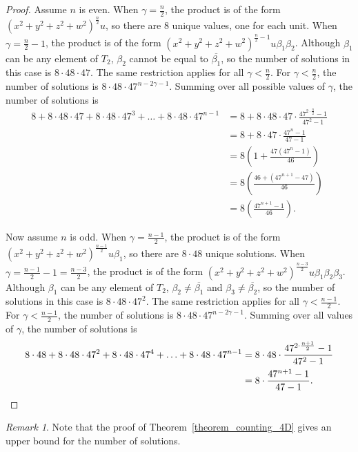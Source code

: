 \documentclass[12pt,table]{article}
\theoremstyle{definition}
\theoremstyle{remark}
\newtheorem{remark}[theorem]{Remark}
\numberwithin{equation}{section}
\begin{document}
\begin{proof}
Assume $ n $ is even.
When $ \gamma = \frac{n}{2} $, the product is of the form
$ (x^2 + y^2 + z^2 + w^2)^{\frac{n}{2}} u  $, so there are 8 unique values, one for
each unit.
When $ \gamma = \frac{n}{2} - 1 $, the product is of the form
$ (x^2 + y^2 + z^2 + w^2)^{\frac{n}{2} - 1} u \beta_1 \beta_2  $. Although $ \beta_1 $
can be any element of $ T_2 $, $ \beta_2 $ cannot be equal to $ \overline{ \beta_1 } $,
so the number of solutions in this case is $ 8 \cdot 48 \cdot 47 $. The same restriction
applies for all $ \gamma < \frac{n}{2} $. For $ \gamma < \frac{n}{2} $,
the number of
solutions is $ 8 \cdot 48 \cdot 47^{n - 2\gamma - 1} $.
Summing over all possible values of $ \gamma $, the number of solutions is
\begin{align*}
8 + 8 \cdot 48 \cdot 47 + 8 \cdot 48 \cdot 47^3 + \ldots
+ 8 \cdot 48 \cdot 47^{n-1}
&= 8 + 8 \cdot 48 \cdot 47 \cdot \frac{47^{2 \cdot \frac{n}{2} } - 1 }{47^2 - 1}
\\
&= 8 + 8 \cdot 47 \cdot \frac{47^{n} - 1 }{47 - 1}
\\
&= 8 \left(1 +  \frac{47 (47^{n} - 1 ) }{46}\right)
\\
&= 8 \left( \frac{46 + (47^{n+1} - 47 ) }{46}\right)
\\
&= 8 \left( \frac{47^{n+1} -1 }{46}\right).
\end{align*}

Now assume $ n $ is odd.
When $ \gamma = \frac{n-1}{2} $, the product is of the form
$ (x^2 + y^2 + z^2 + w^2)^{\frac{n-1}{2}} u \beta_1  $, so there are $ 8 \cdot 48 $
unique solutions.
When $ \gamma = \frac{n-1}{2} - 1 = \frac{n-3}{2}  $, the product is of the form
$ (x^2 + y^2 + z^2 + w^2)^{\frac{n-3}{2}} u \beta_1 \beta_2 \beta_3  $. Although $ \beta_1 $
can be any element of $ T_2 $, $ \beta_2 \neq \overline{ \beta_1 } $
and $ \beta_3 \neq \overline{ \beta_2 } $,
so the number of solutions in this case is $ 8 \cdot 48 \cdot 47^2 $. The same restriction
applies for all $ \gamma < \frac{n-1}{2} $. For $ \gamma < \frac{n-1}{2} $,
the number of solutions is $ 8 \cdot 48 \cdot 47^{n - 2\gamma - 1 } $.
Summing over all values of $ \gamma $, the number of solutions is
\begin{align*}
8 \cdot 48 + 8 \cdot 48 \cdot 47^2 + 8 \cdot 48 \cdot 47^4 + \ldots
+ 8 \cdot 48 \cdot 47^{n-1}
&= 8 \cdot 48 \cdot \frac{47^{2 \cdot \frac{n+1}{2} } - 1 }{47^2 - 1}
\\
&= 8  \cdot \frac{47^{n+1} - 1 }{47 - 1}. \qedhere
\end{align*}
\end{proof}
\begin{remark}
Note that the proof of Theorem~\ref{theorem_counting_4D}
gives an upper bound for the number of solutions.
\end{remark}
\end{document}
